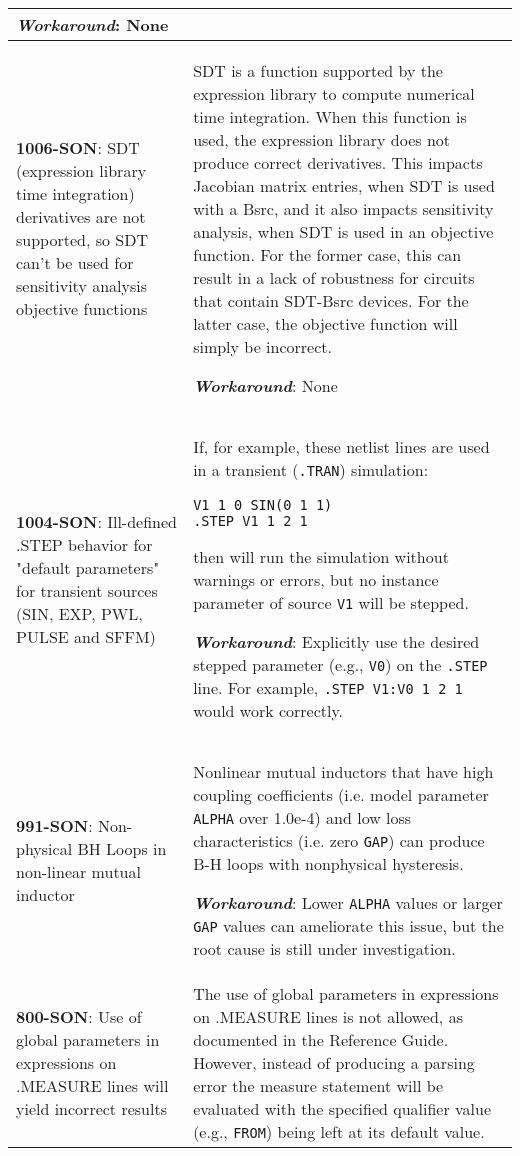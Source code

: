 {\begin{longtable}[h] {>{\raggedright\small}m{2in}|>{\raggedright\let\\\tabularnewline\small}m{3.5in}}
\textbf{\textit{Workaround}}: None
\\ \hline

  \textbf{1006-SON}:   SDT (expression library time integration) derivatives are not supported, so SDT can't be used for sensitivity analysis objective functions &
  SDT is a function supported by the \Xyce{} expression library to compute numerical time integration.  When this function is used, the expression library does not produce correct derivatives.  This impacts Jacobian matrix entries, when SDT is used with a Bsrc, and it also impacts sensitivity analysis, when SDT is used in an objective function.  For the former case, this can result in a lack of robustness for circuits that contain SDT-Bsrc devices.  For the latter case, the objective function will simply be incorrect.

\textbf{\textit{Workaround}}: None
\\ \hline

\textbf{1004-SON}: Ill-defined .STEP behavior for "default parameters" for 
transient sources (SIN, EXP, PWL, PULSE and SFFM) & If, for example,
these netlist lines are used in a transient (\texttt{.TRAN}) simulation:
\begin{verbatim}
V1 1 0 SIN(0 1 1)
.STEP V1 1 2 1
\end{verbatim}
then \Xyce{} will run the simulation without warnings or errors, but
no instance parameter of source \texttt{V1} will be stepped.  

\textbf{\textit{Workaround}}: Explicitly use the desired stepped parameter
(e.g., \texttt{V0}) on the \texttt{.STEP} line.  For example, 
\texttt{.STEP V1:V0 1 2 1} would work correctly.
\\ \hline

\textbf{991-SON}: Non-physical BH Loops in non-linear mutual inductor &
Nonlinear mutual inductors that have high coupling coefficients (i.e. 
model parameter \texttt{ALPHA} over 1.0e-4) and low loss characteristics 
(i.e. zero \texttt{GAP}) can produce B-H loops with nonphysical hysteresis.

\textbf{\textit{Workaround}}: Lower \texttt{ALPHA} values or larger 
\texttt{GAP} values can ameliorate this issue, but the root cause is 
still under investigation. 
\\ \hline

\textbf{800-SON}: Use of global parameters in expressions on .MEASURE lines
will yield incorrect results & The use of global parameters in expressions
on .MEASURE lines is not allowed, as documented in the \Xyce{} Reference Guide.
However, instead of producing a parsing error the measure statement will be
evaluated with the specified qualifier value (e.g., \texttt{FROM}) being left
at its default value.


\end{longtable}}

